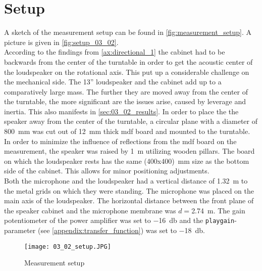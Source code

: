 \section*{Setup}
A sketch of the measurement setup can be found in \autoref{fig:measurement_setup}. A picture is given in \autoref{fig:setup_03_02}. \\
According to the findings from \autoref{ax:directional_1} the cabinet had to be backwards from the center of the turntable in order to get the acoustic center of the loudspeaker on the rotational axis. This put up a considerable challenge on the mechanical side.
The 13'' loudspeaker and the cabinet add up to a comparatively large mass. The further they are moved away from the center of the turntable, the more significant are the issues arise, caused by leverage and inertia. This also manifests in \autoref{sec:03_02_results}.
In order to place the the speaker away from the center of the turntable, a circular plane with a diameter of \SI{800}{\milli\meter} was cut out of \SI{12}{\milli\meter} thick \gls{mdf} board and mounted to the turntable. In order to minimize the influence of reflections from the \gls{mdf} board on the measurement, the speaker was raised by \SI{1}{\meter} utilizing wooden pillars. The board on which the loudspeaker rests has the same (400x400)\SI{}{\milli\meter} size as the bottom side of the cabinet. This allows for minor positioning adjustments.\\
Both the microphone and the loudspeaker had a vertical distance of \SI{1.32}{\meter} to the metal grids on which they were standing. The microphone was placed on the main axis of the loudspeaker. The horizontal distance between the front plane of the speaker cabinet and the microphone membrane was \(d=\)\SI{2.74}{\meter}.
The gain potentiometer of the power amplifier was set to \SI{-16}{\decibel} and the \texttt{playgain}-parameter (see \autoref{appendix:transfer_function}) was set to \SI{-18}{\decibel}.

\begin{figure}[htbp]
	\centering
	\texttt{[image: 03\_02\_setup.JPG]}
	\caption{Measurement setup}
		\label{fig:setup_03_02}
\end{figure}

